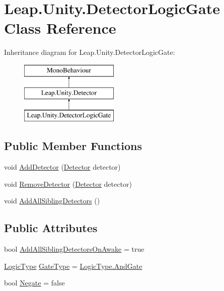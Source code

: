 \hypertarget{class_leap_1_1_unity_1_1_detector_logic_gate}{}\section{Leap.\+Unity.\+Detector\+Logic\+Gate Class Reference}
\label{class_leap_1_1_unity_1_1_detector_logic_gate}
Inheritance diagram for Leap.\+Unity.\+Detector\+Logic\+Gate\+:\begin{figure}[H]
\begin{center}
\leavevmode
\includegraphics[height=3.000000cm]{class_leap_1_1_unity_1_1_detector_logic_gate}
\end{center}
\end{figure}
\subsection*{Public Member Functions}
\begin{DoxyCompactItemize}
\item 
void \mbox{\hyperlink{class_leap_1_1_unity_1_1_detector_logic_gate_af4ae12b9708b39ea714111658a70c2df}{Add\+Detector}} (\mbox{\hyperlink{class_leap_1_1_unity_1_1_detector}{Detector}} detector)
\item 
void \mbox{\hyperlink{class_leap_1_1_unity_1_1_detector_logic_gate_a91e6fa77ae70a62f92afd1016b0d738e}{Remove\+Detector}} (\mbox{\hyperlink{class_leap_1_1_unity_1_1_detector}{Detector}} detector)
\item 
void \mbox{\hyperlink{class_leap_1_1_unity_1_1_detector_logic_gate_a68c43209a42021b8b4e8d5cfecc29d5b}{Add\+All\+Sibling\+Detectors}} ()
\end{DoxyCompactItemize}
\subsection*{Public Attributes}
\begin{DoxyCompactItemize}
\item 
bool \mbox{\hyperlink{class_leap_1_1_unity_1_1_detector_logic_gate_aded5589c25fc872d3f1690da8351e3f1}{Add\+All\+Sibling\+Detectors\+On\+Awake}} = true
\item 
\mbox{\hyperlink{namespace_leap_1_1_unity_a77852b6f4a12b4cff02c45dd93e7b2b1}{Logic\+Type}} \mbox{\hyperlink{class_leap_1_1_unity_1_1_detector_logic_gate_a972e022cb5a0bdb6d3a6a3358d9190b2}{Gate\+Type}} = \mbox{\hyperlink{namespace_leap_1_1_unity_a77852b6f4a12b4cff02c45dd93e7b2b1a296b4d7851ca3e55bce82683249c4d0e}{Logic\+Type.\+And\+Gate}}
\item 
bool \mbox{\hyperlink{class_leap_1_1_unity_1_1_detector_logic_gate_a0c78e1045905a4dd1c349aa677a8a97d}{Negate}} = false
\end{DoxyCompactItemize}
